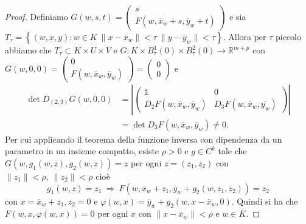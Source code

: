 \begin{proof}
Definiamo $G(w,s,t)=\begin{pmatrix}s\\F(w,\overline{x}_{w}+s,\overline{y}_{w}+t)\end{pmatrix}$ e sia \\$T_{\tau}=\left\{(w,x,y):w\in K \ \|x-\overline{x}_{w}\|<\tau \ \|y-\overline{y}_{w}\|<\tau\right\}$. Allora per $\tau$ piccolo abbiamo che $T_{\tau}\subset K\times U\times V$ e $G:K\times B^{1}_{\tau}(0)\times B^{2}_{\tau}(0) \rightarrow\mathbb{R}^{m+p}$ con $G(w,0,0)=\begin{pmatrix}0\\F(w,\overline{x}_{w},\overline{y}_{w})\end{pmatrix}=\begin{pmatrix}0\\0\end{pmatrix}$
e
\begin{align*}
\det D_{(2,3)}G(w,0,0) & =
\left\vert\begin{pmatrix}\mathds{1} & 0\\D_{2}F(w,\overline{x}_{w},\overline{y}_{w}) & D_{3}F(w,\overline{x}_{w},\overline{y_{w}})\end{pmatrix}\right\vert \\ & =
\det D_{3}F(w,\overline{x}_{w},\overline{y}_{w})\neq 0.
\end{align*}
Per cui applicando il teorema della funzione inversa con dipendenza da un parametro in un insieme compatto, esiste $\rho >0$ e $g\in C^{k}$ tale che $G(w,g_{1}(w,z),g_{2}(w,z))=z$ per ogni $z=(z_{1},z_{2})$ con $\|z_{1}\|<\rho, \ \|z_{2}\|<\rho$ cioè 
\begin{equation*}
g_{1}(w,z)=z_{1} \ \Longrightarrow \
F(w,\overline{x}_{w}+z_{1},\overline{y}_{w}+g_{2}(w,z_{1},z_{2}))=z_{2}
\end{equation*}
con $x=\overline{x}_{w}+z_{1}, z_{2}=0$ e $\varphi(w,x)=\overline{y}_{w}+g_{2}(w,x-\overline{x}_{w},0)$. Quindi si ha che $F(w,x,\varphi(w,x))=0$ per ogni $x$ con $\|x-\overline{x}_{w}\|<\rho$ e $w\in K$.
\end{proof}

